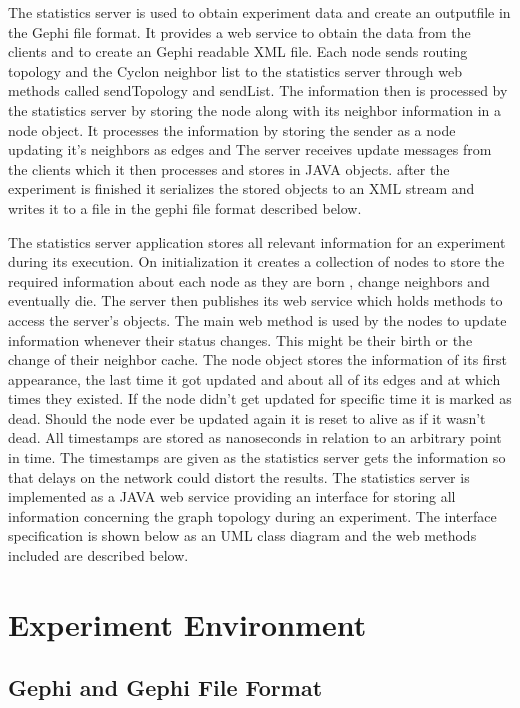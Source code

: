 The statistics server is used to obtain experiment data and create an outputfile
in the Gephi file format. It provides a web service to obtain the data from the
clients and to create an Gephi readable XML file.  Each node sends routing
topology and the Cyclon neighbor list to the statistics server
through web methods called sendTopology and sendList. The information then is
processed by the statistics server by storing the node along with its neighbor
information in a node object.  It processes the information by storing the
sender as a node updating it's neighbors as edges and The server receives update messages from the clients which it then processes and stores in JAVA objects.
after the experiment is finished it serializes the stored objects to an XML
stream and writes it to a file in the gephi file format described below.

The statistics server application stores all relevant information for an
experiment during its execution. On initialization it creates a collection of
nodes to store the required information about each node as they are born ,
change neighbors and eventually die. The server then publishes its web service
which holds methods to access the server's objects. The main web method is used
by the nodes to update information whenever their status changes. This might be
their birth or the change of their neighbor cache. The node object stores the
information of its first appearance, the last time it got updated and about all
of its edges and at which times they existed. If the node didn't get updated for
specific time it is marked as dead. Should the node ever be updated again it is
reset to alive as if it wasn't dead. All timestamps are stored as nanoseconds in
relation to an arbitrary point in time. The timestamps are given as the
statistics server gets the information so that delays on the network could
distort the results.
The statistics server is implemented as a JAVA web service providing an
interface for storing all information concerning the graph topology during an
experiment. The interface specification is shown below as an UML class diagram
and the web methods included are described below.






\section{Experiment Environment}

\subsection{Gephi and Gephi File Format}